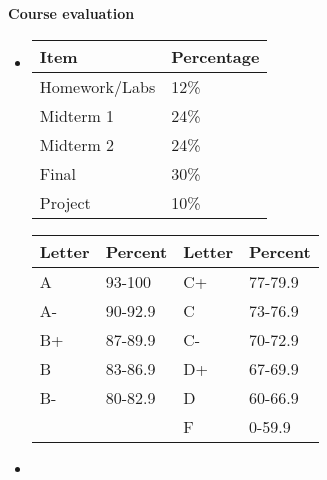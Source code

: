 \documentclass[letterpaper,12pt]{report}
\begin{document}
\textbf{Course evaluation}
\begin{itemize}
\item[]
\begin{minipage}{0.35\textwidth}
{\renewcommand{\arraystretch}{1.2}
\begin{tabular}{|ll|}
\hline
Item & Percentage \\
\hline
Homework/Labs    & 12\%\\
Midterm 1          & 24\%  \\
Midterm 2          & 24\%  \\
Final              & 30\% \\
Project            & 10\%\\
\hline
\end{tabular}}
\vskip30pt
\end{minipage}
\begin{minipage}{0.05\textwidth} \hspace{0.05in} \end{minipage}
\begin{minipage}{0.25\textwidth}
\begin{tabular}{|llll|}
\hline
Letter & Percent & Letter & Percent \\
\hline
A	&	93-100	& C+	&	77-79.9	\\
A-	&	90-92.9	& C	&	73-76.9	\\
B+	&	87-89.9	& C-	&	70-72.9	\\
B	&	83-86.9	& D+	&	67-69.9	\\
B-	&	80-82.9	& D	&	60-66.9	\\
     &          & F &	0-59.9	\\
\hline
\end{tabular}
\end{minipage}
%
\item[]
\end{itemize}
\end{document}
